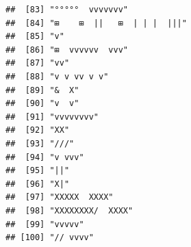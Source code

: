 \documentclass[
]{article}
\begin{document}
\begin{verbatim}
##  [83] "°°°°°  vvvvvvv"                                                                                                                           
##  [84] "⊞    ⊞  ||   ⊞  | | |  |||"                                                                                                               
##  [85] "v"                                                                                                                                        
##  [86] "⊞  vvvvvv  vvv"                                                                                                                           
##  [87] "vv"                                                                                                                                       
##  [88] "v v vv v v"                                                                                                                               
##  [89] "&  X"                                                                                                                                     
##  [90] "v  v"                                                                                                                                     
##  [91] "vvvvvvvv"                                                                                                                                 
##  [92] "XX"                                                                                                                                       
##  [93] "///"                                                                                                                                      
##  [94] "v vvv"                                                                                                                                    
##  [95] "||"                                                                                                                                       
##  [96] "X|"                                                                                                                                       
##  [97] "XXXXX  XXXX"                                                                                                                              
##  [98] "XXXXXXXX/  XXXX"                                                                                                                          
##  [99] "vvvvv"                                                                                                                                    
## [100] "// vvvv"                                                                                                                                  

\end{verbatim}
\end{document}
